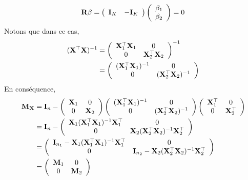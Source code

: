 \begin{align*}
\mathbf{R}\beta =
\left(\begin{array}{cc}
\mathbf{I}_K&-\mathbf{I}_K
\end{array}
\right)
\left(
\begin{array}{c}
\beta_1\\
\beta_2
\end{array}
\right)
=0
\end{align*}
Notons que dans ce cas,
\begin{align*}
(\mathbf X^\top\mathbf X)^{-1} &=
\left(
\begin{array}{cc}
\mathbf X_1^\top\mathbf X_1 &0\\
0&\mathbf X_2^\top\mathbf X_2
\end{array}
\right) ^{-1}\\
&=
\left(
\begin{array}{cc}
(\mathbf X_1^\top\mathbf X_1)^{-1} &0\\
0&(\mathbf X_2^\top\mathbf X_2)^{-1}
\end{array}
\right) 
\end{align*}
En conséquence,
\begin{align*}
\mathbf M_\mathbf X&=\mathbf{I}_n 
- 
\left(
\begin{array}{cc}
\mathbf X_1&0\\
0&\mathbf X_2
\end{array}
\right)
\left(
\begin{array}{cc}
(\mathbf X_1^\top\mathbf X_1)^{-1} &0\\
0&(\mathbf X_2^\top\mathbf X_2)^{-1}
\end{array}
\right) 
\left(
\begin{array}{cc}
\mathbf X_1^\top&0\\
0&\mathbf X_2^\top
\end{array}
\right)
\\
&=\mathbf{I}_n - \left(
\begin{array}{cc}
\mathbf X_1(\mathbf X_1^\top\mathbf X_1)^{-1}\mathbf X_1^\top &0\\
0&\mathbf X_2(\mathbf X_2^\top\mathbf X_2)^{-1}\mathbf X_2^\top
\end{array}
\right) 
\\
&= 
\left(
\begin{array}{cc}
\mathbf{I}_{n_1} - \mathbf X_1(\mathbf X_1^\top\mathbf X_1)^{-1}\mathbf X_1^\top &0\\
0&\mathbf{I}_{n_2} - \mathbf X_2(\mathbf X_2^\top\mathbf X_2)^{-1}\mathbf X_2^\top
\end{array}
\right) \\
&= \left(
\begin{array}{cc}
\mathbf M_1&0\\
0&\mathbf M_2
\end{array}
\right)
\end{align*}
